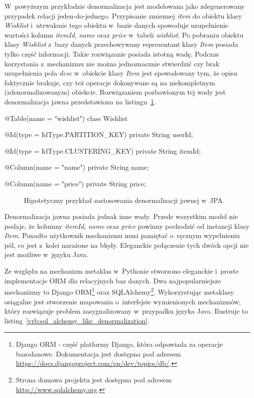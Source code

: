 W~powyższym przykładzie denormalizacja jest modelowana jako zdegenerowany przypadek relacji jeden-do-jednego. Przypisanie zmiennej \emph{item} do obiektu klasy \emph{Wishlist} i~utrwalenie tego obiektu w~bazie danych spowoduje uzupełnienie wartości kolumn \emph{itemId}, \emph{name} oraz \emph{price} w~tabeli \emph{wishlist}. Po pobraniu obiektu klasy \emph{Wishlist} z~bazy danych przechowywany reprezentant klasy \emph{Item} posiada tylko część informacji. Takie rozwiązanie posiada istotną wadę. Podczas korzystania z~mechanizmu nie można jednoznacznie stwierdzić czy brak uzupełnienia pola \emph{desc} w~obiekcie klasy \emph{Item} jest spowodowany tym, że opisu faktycznie brakuje, czy też operacje dokonywane są na niekompletnym (zdenormalizowanym) obiekcie. Rozwiązaniem pozbawionym tej wady jest denormalizacja jawna przedstawiona na listingu~\ref{vrb:jpa_explicit_denormalization_theory}.

\begin{verbbox}[\footnotesize]
	@Table(name = "wishlist")
	class Wishlist {
	    @Id(type = IdType.PARTITION_KEY) 
	    private String userId;

	    @Id(type = IdType.CLUSTERING_KEY)
	    private String itemId;

	    @Column(name = "name")
	    private String name;

	    @Column(name = "price")
	    private String price;
	}
\end{verbbox}

\begin{figure}[ht!]
	\centering
	\theverbbox
	\caption{Hipotetyczny przykład zastosowania denormalizacji jawnej w~JPA.}
	\label{vrb:jpa_explicit_denormalization_theory}
\end{figure}

Denormalizacja jawna posiada jednak inne wady. Przede wszystkim model nie podaje, że kolumny \emph{itemId}, \emph{name} oraz \emph{price} powinny pochodzić od instancji klasy \emph{Item}. Ponadto użytkownik mechanizmu musi pamiętać o~ręcznym wypełnieniu pól, co jest z~kolei narażone na błędy. Eleganckie połączenie tych dwóch opcji nie jest możliwe w~języku Java. 

Ze względu na mechanizm metaklas w~Pythonie stworzono eleganckie i~proste implementacje ORM dla relacyjnych baz danych. Dwa najpopularniejsze mechanizmy to Django ORM\footnote{Django ORM - część platformy Django, która odpowiada za operacje bazodanowe. Dokumentacja jest dostępna pod adresem \url{https://docs.djangoproject.com/en/dev/topics/db/}.} oraz SQLAlchemy\footnote{Strona domowa projektu jest dostępna pod adresem \url{http://www.sqlalchemy.org}.}. Wykorzystując metaklasy osiągalne jest stworzenie mapowania o~interfejsie wymienionych mechanizmów, który rozwiązuje problem zasygnalizowany w~przypadku języka Java. Ilustruje to listing~\ref{vrb:sql_alchemy_like_denormalization}.

